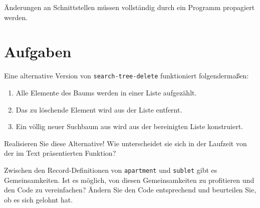 \begin{mantra}
  Änderungen an Schnittstellen müssen vollständig durch ein Programm
  propagiert werden.
\end{mantra}


\section*{Aufgaben}

\begin{aufgabe}\label{ex:naive-delete}
  Eine alternative Version von \texttt{search-tree-delete}
  funktioniert folgendermaßen:
  \begin{enumerate}
  \item Alle Elemente des Baums werden in einer Liste aufgezählt.
  \item Das zu löschende Element wird aus der Liste entfernt.
  \item Ein völlig neuer Suchbaum aus wird aus der bereinigten Liste
    konstruiert.
  \end{enumerate}
  Realisieren Sie diese Alternative!  Wie unterscheidet sie sich in
  der Laufzeit von der im Text präsentierten Funktion?
\end{aufgabe}

\begin{aufgabe}
  Zwischen den Record-Definitionen von \texttt{apartment} und
  \texttt{sublet} gibt es Gemeinsamkeiten.  Ist es möglich, von diesen
  Gemeinsamkeiten zu profitieren und den Code zu vereinfachen?
  Ändern Sie den Code entsprechend und beurteilen Sie, ob es sich
  gelohnt hat.
\end{aufgabe}


